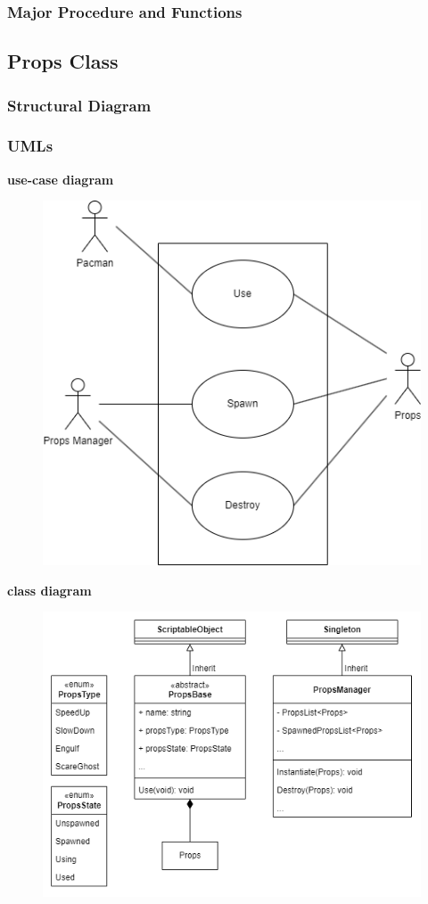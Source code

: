 \documentclass[11pt]{article}
\begin{document}
\subsubsection{Major Procedure and Functions}

\subsection{Props Class}
\subsubsection{Structural Diagram}
\subsubsection{UMLs}
\textbf{use-case diagram}\\
\begin{figure}[H]
    \centering
    \includegraphics*[scale=0.4]{Props_use-case.png}
\end{figure}
\textbf{class diagram}\\
\begin{figure}[H]
    \centering
    \includegraphics*[scale=0.4]{Props-Class.png}
\end{figure}
\end{document}
